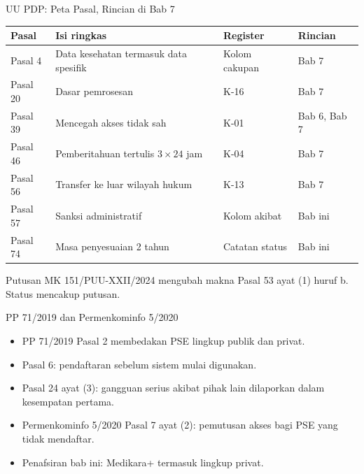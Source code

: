 \documentclass[aspectratio=169, table, 12pt]{beamer}
\begin{document}
\begin{frame}{{\Large UU PDP: Peta Pasal, Rincian di Bab 7}}
  \vspace{2pt}
  \footnotesize
  \begin{tabularx}{\textwidth}{|>{\raggedright\arraybackslash}p{}|>{\raggedright\arraybackslash}X|>{\raggedright\arraybackslash}p{}|>{\raggedright\arraybackslash}p{}|}
    \hline
    \textbf{Pasal} & \textbf{Isi ringkas} & \textbf{Register} & \textbf{Rincian} \\ \hline
    Pasal 4 & Data kesehatan termasuk data spesifik & Kolom cakupan & Bab 7 \\ \hline
    Pasal 20 & Dasar pemrosesan & K-16 & Bab 7 \\ \hline
    Pasal 39 & Mencegah akses tidak sah & K-01 & Bab 6, Bab 7 \\ \hline
    Pasal 46 & Pemberitahuan tertulis $3 \times 24$ jam & K-04 & Bab 7 \\ \hline
    Pasal 56 & Transfer ke luar wilayah hukum & K-13 & Bab 7 \\ \hline
    Pasal 57 & Sanksi administratif & Kolom akibat & Bab ini \\ \hline
    Pasal 74 & Masa penyesuaian 2 tahun & Catatan status & Bab ini \\ \hline
  \end{tabularx}

  \vspace{6pt}
  \small Putusan MK 151/PUU-XXII/2024 mengubah makna Pasal 53 ayat (1) huruf b. Status mencakup putusan.
\end{frame}

\begin{frame}{{\Large PP 71/2019 dan Permenkominfo 5/2020}}
  \vspace{4pt}
  \small
  \begin{itemize}
    \item PP 71/2019 Pasal 2 membedakan PSE lingkup publik dan privat.
    \item Pasal 6: pendaftaran sebelum sistem mulai digunakan.
    \item Pasal 24 ayat (3): gangguan serius akibat pihak lain dilaporkan dalam kesempatan pertama.
    \item Permenkominfo 5/2020 Pasal 7 ayat (2): pemutusan akses bagi PSE yang tidak mendaftar.
    \item Penafsiran bab ini: Medikara+ termasuk lingkup privat.
  \end{itemize}
\end{frame}
\end{document}
